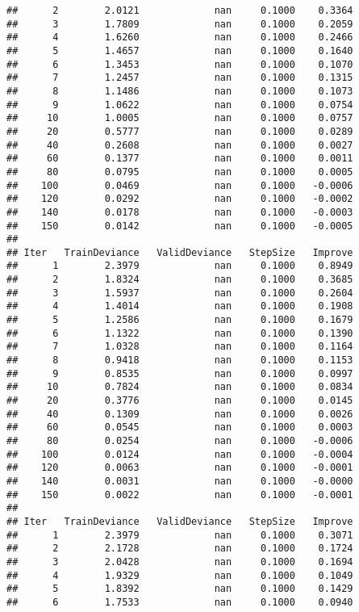 \documentclass[]{article}
\begin{document}
\begin{verbatim}
##      2        2.0121             nan     0.1000    0.3364
##      3        1.7809             nan     0.1000    0.2059
##      4        1.6260             nan     0.1000    0.2466
##      5        1.4657             nan     0.1000    0.1640
##      6        1.3453             nan     0.1000    0.1070
##      7        1.2457             nan     0.1000    0.1315
##      8        1.1486             nan     0.1000    0.1073
##      9        1.0622             nan     0.1000    0.0754
##     10        1.0005             nan     0.1000    0.0757
##     20        0.5777             nan     0.1000    0.0289
##     40        0.2608             nan     0.1000    0.0027
##     60        0.1377             nan     0.1000    0.0011
##     80        0.0795             nan     0.1000    0.0005
##    100        0.0469             nan     0.1000   -0.0006
##    120        0.0292             nan     0.1000   -0.0002
##    140        0.0178             nan     0.1000   -0.0003
##    150        0.0142             nan     0.1000   -0.0005
## 
## Iter   TrainDeviance   ValidDeviance   StepSize   Improve
##      1        2.3979             nan     0.1000    0.8949
##      2        1.8324             nan     0.1000    0.3685
##      3        1.5937             nan     0.1000    0.2604
##      4        1.4014             nan     0.1000    0.1908
##      5        1.2586             nan     0.1000    0.1679
##      6        1.1322             nan     0.1000    0.1390
##      7        1.0328             nan     0.1000    0.1164
##      8        0.9418             nan     0.1000    0.1153
##      9        0.8535             nan     0.1000    0.0997
##     10        0.7824             nan     0.1000    0.0834
##     20        0.3776             nan     0.1000    0.0145
##     40        0.1309             nan     0.1000    0.0026
##     60        0.0545             nan     0.1000    0.0003
##     80        0.0254             nan     0.1000   -0.0006
##    100        0.0124             nan     0.1000   -0.0004
##    120        0.0063             nan     0.1000   -0.0001
##    140        0.0031             nan     0.1000   -0.0000
##    150        0.0022             nan     0.1000   -0.0001
## 
## Iter   TrainDeviance   ValidDeviance   StepSize   Improve
##      1        2.3979             nan     0.1000    0.3071
##      2        2.1728             nan     0.1000    0.1724
##      3        2.0428             nan     0.1000    0.1694
##      4        1.9329             nan     0.1000    0.1049
##      5        1.8392             nan     0.1000    0.1429
##      6        1.7533             nan     0.1000    0.0940

\end{verbatim}
\end{document}
